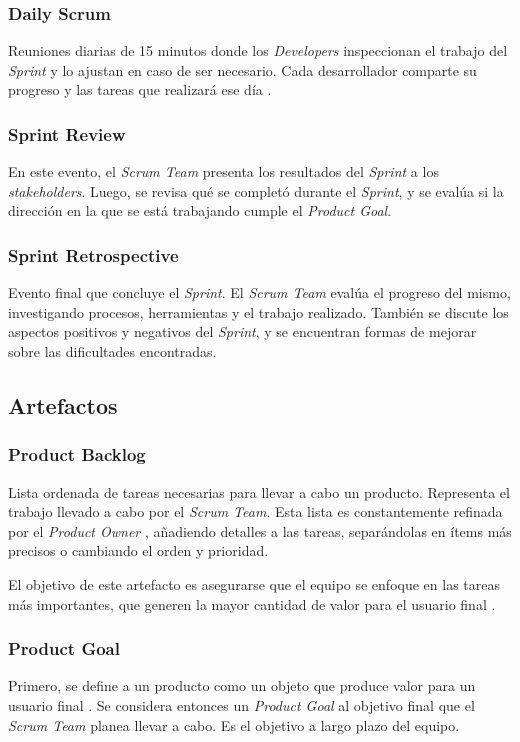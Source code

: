 \subsubsection{Daily Scrum}
Reuniones diarias de 15 minutos donde los \emph{Developers} inspeccionan el trabajo del \emph{Sprint} y lo ajustan en caso de ser necesario. Cada desarrollador comparte su progreso y las tareas que realizará ese día \cite{bartoszScrumVideoGames2023,schwaberScrumGuide2020}.
%
\subsubsection{Sprint Review}
En este evento, el \emph{Scrum Team} presenta los resultados del \emph{Sprint} a los \emph{stakeholders}. Luego, se revisa qué se completó durante el \emph{Sprint}, y se evalúa si la dirección en la que se está trabajando cumple el \emph{Product Goal}.
%
\subsubsection{Sprint Retrospective}
Evento final que concluye el \emph{Sprint}. El \emph{Scrum Team} evalúa el progreso del mismo, investigando procesos, herramientas y el trabajo realizado. También se discute los aspectos positivos y negativos del \emph{Sprint}, y se encuentran formas de mejorar sobre las dificultades encontradas.
%
%
\subsection{Artefactos}
%
\subsubsection{Product Backlog}
\par Lista ordenada de tareas necesarias para llevar a cabo un producto. Representa el trabajo llevado a cabo por el \emph{Scrum Team}. Esta lista es constantemente refinada por el \emph{Product Owner} \cite{cynthiachizobaekechiEnhancingAgileProduct2024}, añadiendo detalles a las tareas, separándolas en ítems más precisos o cambiando el orden y prioridad.
\par El objetivo de este artefacto es asegurarse que el equipo se enfoque en las tareas más importantes, que generen la mayor cantidad de valor para el usuario final \cite{cynthiachizobaekechiEnhancingAgileProduct2024}.
%
\subsubsection{Product Goal}
\par Primero, se define a un producto como un objeto que produce valor para un usuario final \cite{schwaberScrumGuide2020}. Se considera entonces un \emph{Product Goal} al objetivo final que el \emph{Scrum Team} planea llevar a cabo. Es el objetivo a largo plazo del equipo.
%

